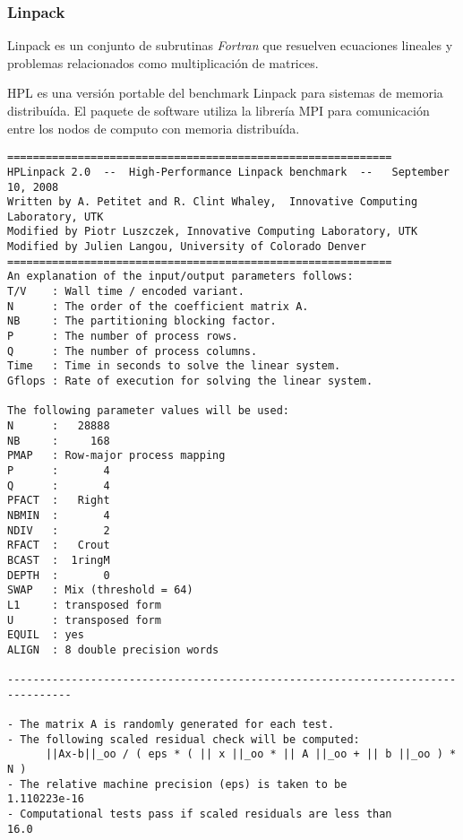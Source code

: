 \documentclass[a4paper]{report}
\begin{document}
\subsubsection{Linpack}

\cite{linpack}

Linpack es un conjunto de subrutinas {\it Fortran} que resuelven ecuaciones lineales y problemas relacionados como
multiplicaci\'on de matrices.

\cite{hpl}

HPL es una versi\'on portable del benchmark Linpack para sistemas de memoria distribu\'ida. El paquete de software
utiliza la librer\'ia MPI para comunicaci\'on entre los nodos de computo con memoria distribu\'ida.

\begin{verbatim}
============================================================
HPLinpack 2.0  --  High-Performance Linpack benchmark  --   September 10, 2008
Written by A. Petitet and R. Clint Whaley,  Innovative Computing Laboratory, UTK
Modified by Piotr Luszczek, Innovative Computing Laboratory, UTK
Modified by Julien Langou, University of Colorado Denver
============================================================
An explanation of the input/output parameters follows:
T/V    : Wall time / encoded variant.
N      : The order of the coefficient matrix A.
NB     : The partitioning blocking factor.
P      : The number of process rows.
Q      : The number of process columns.
Time   : Time in seconds to solve the linear system.
Gflops : Rate of execution for solving the linear system.

The following parameter values will be used:
N      :   28888
NB     :     168
PMAP   : Row-major process mapping
P      :       4
Q      :       4
PFACT  :   Right
NBMIN  :       4
NDIV   :       2
RFACT  :   Crout
BCAST  :  1ringM
DEPTH  :       0
SWAP   : Mix (threshold = 64)
L1     : transposed form
U      : transposed form
EQUIL  : yes
ALIGN  : 8 double precision words

--------------------------------------------------------------------------------

- The matrix A is randomly generated for each test.
- The following scaled residual check will be computed:
      ||Ax-b||_oo / ( eps * ( || x ||_oo * || A ||_oo + || b ||_oo ) * N )
- The relative machine precision (eps) is taken to be               1.110223e-16
- Computational tests pass if scaled residuals are less than                16.0


\end{verbatim}
\end{document}
